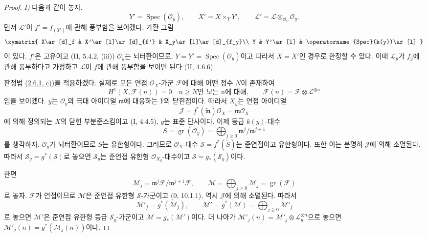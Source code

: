 \begin{proof}
\noindent\textit{I)}
다음과 같이 놓자.
\[
Y'=\operatorname{Spec}(\mathcal O_y),\qquad
X'=X\times_YY',\qquad
\mathcal L'=\mathcal L\otimes_{\mathcal O_Y}\mathcal O_y.
\]
먼저 $\mathcal L'$이 $f'=f_{(Y')}$에 관해 풍부함을 보이겠다.
가환 그림
\[
\xymatrix{
X\ar[d]_f & X'\ar[l]\ar[d]_{f'} & X_y\ar[l]\ar[d]_{f_y}\\
Y & Y'\ar[l] & \operatorname{Spec}(k(y))\ar[l]
}
\]
이 있다. $f'$은 고유이고 (II, 5.4.2, (iii)) $\mathcal O_y$는
뇌터환이므로, $Y=Y'=\operatorname{Spec}(\mathcal O_y)$이고
따라서 $X=X'$인 경우로 한정할 수 있다. 이때 $\mathcal L_y$가
$f_y$에 관해 풍부하다고 가정하고 $\mathcal L$이 $f$에 관해
풍부함을 보이면 된다 (II, 4.6.6).

판정법 (\hyperref[III.2.6.1-fr]{2.6.1, c)})을 적용하겠다. 실제로
모든 연접 $\mathcal O_X$-가군 $\mathcal F$에 대해 어떤 정수 $N$이
존재하여
\[
H^1(X,\mathcal F(n))=0\quad\text{$n\geq N$인 모든 $n$에 대해},
\qquad
\mathcal F(n)=\mathcal F\otimes\mathcal L^{\otimes n}
\]
임을 보이겠다. $y$는 $\mathcal O_y$의 극대 아이디얼
$\mathfrak m$에 대응하는 $Y$의 닫힌점이다. 따라서 $X_y$는 연접
아이디얼
\[
\mathcal J=f^*(\widetilde{\mathfrak m})\mathcal O_X
=\mathfrak m\mathcal O_X
\]
에 의해 정의되는 $X$의 닫힌 부분준스킴이고 (I, 4.4.5), $g$는
표준 단사이다. 이제 등급 $k(y)$-대수
\[
S=\operatorname{gr}(\mathcal O_y)
=\bigoplus_{j\geq0}\mathfrak m^j/\mathfrak m^{j+1}
\]
를 생각하자. $\mathcal O_y$가 뇌터환이므로 $S$는 유한형이다.
그러므로 $\mathcal O_X$-대수
$\mathcal S=f^*(\widetilde S)$는 준연접이고 유한형이다.
또한 이는 분명히 $\mathcal J$에 의해 소멸된다. 따라서
$\mathcal S_y=g^*(\mathcal S)$로 놓으면 $\mathcal S_y$는 준연접
유한형 $\mathcal O_{X_y}$-대수이고
$\mathcal S=g_*(\mathcal S_y)$이다.

한편
\[
\mathcal M_j=\mathfrak m^j\mathcal F/
\mathfrak m^{j+1}\mathcal F,\qquad
\mathcal M=\bigoplus_{j\geq0}\mathcal M_j
=\operatorname{gr}(\mathcal F)
\]
로 놓자. $\mathcal F$가 연접이므로 $\mathcal M$은 준연접 유한형
$\mathcal S$-가군이고 (0, 10.1.1), 역시 $\mathcal J$에 의해
소멸된다. 따라서
\[
\mathcal M'_j=g^*(\mathcal M_j),\qquad
\mathcal M'=g^*(\mathcal M)
=\bigoplus_{j\geq0}\mathcal M'_j
\]
로 놓으면 $\mathcal M'$은 준연접 유한형 등급
$\mathcal S_y$-가군이고 $\mathcal M=g_*(\mathcal M')$이다.
더 나아가
$\mathcal M'_j(n)=\mathcal M'_j\otimes\mathcal L_y^{\otimes n}$으로
놓으면 $\mathcal M'_j(n)=g^*(\mathcal M_j(n))$이다.


\end{proof}
